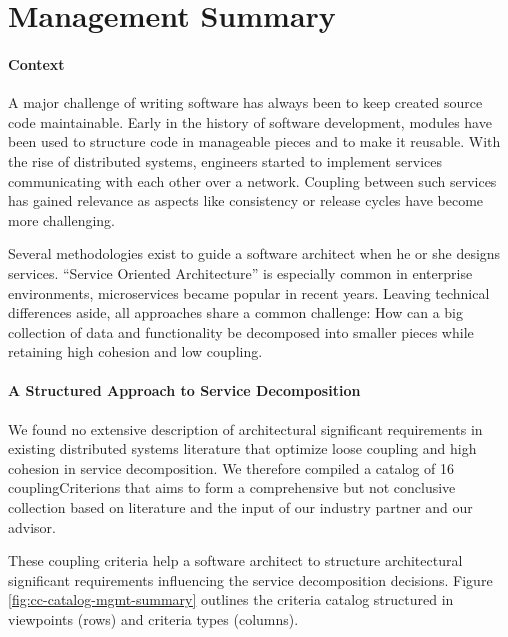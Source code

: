 \chapter{Management Summary}


\subsubsection{Context}

A major challenge of writing software has always been to keep created source code maintainable. Early in the history of software development, modules have been used to structure code in manageable pieces and to make it reusable. With the rise of distributed systems, engineers started to implement services communicating with each other over a network. Coupling between such services has gained relevance as aspects like consistency or release cycles have become more challenging.

Several methodologies exist to guide a software architect when he or she designs services. \enquote{Service Oriented Architecture} is especially common in enterprise environments, microservices became popular in recent years. Leaving technical differences aside, all approaches share a common challenge: How can a big collection of data and functionality be decomposed into smaller pieces while retaining high cohesion and low coupling.

\subsubsection{A Structured Approach to Service Decomposition}

We found no extensive description of architectural significant requirements in existing distributed systems literature that optimize loose coupling and high cohesion in service decomposition. We therefore compiled a catalog of 16 \glspl{couplingCriterion} that aims to form a comprehensive but not conclusive collection based on literature and the input of our industry partner and our advisor. 

These coupling criteria help a software architect to structure architectural significant requirements influencing the service decomposition decisions. Figure \ref{fig:cc-catalog-mgmt-summary} outlines the criteria catalog structured in viewpoints (rows) and criteria types (columns).
 
